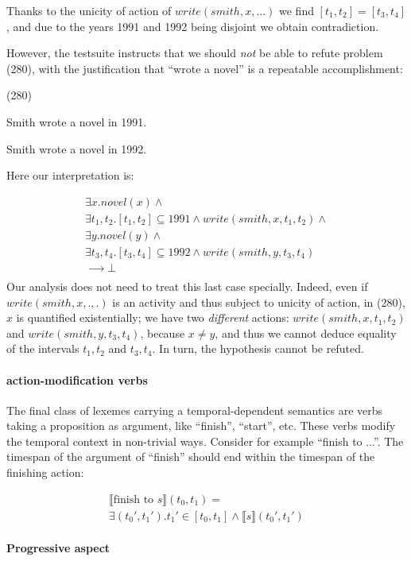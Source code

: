 \documentclass[a4paper,11pt]{article}
\newcommand\hyp{\item[H]}
\newcommand\fracasex[2]{\begin{lingex}\item[(#1)] \begin{subex} #2 \end{subex} \end{lingex} }
\begin{document}
Thanks to the unicity of action of $write(smith,x,...)$ we find
\([t_1,t_2] = [t_3,t_4]\), and due to the years 1991 and 1992 being
disjoint we obtain contradiction.

However, the testsuite instructs that we should \emph{not} be able to refute
problem (280), with the justification that ``wrote a novel'' is a repeatable
accomplishment:

\fracasex{280}{
\item	Smith wrote a novel in 1991.
\hyp 	Smith wrote a novel in 1992.
}
Here our interpretation is:

\[\begin{array}{l}
∃x. novel(x) ∧ \\
∃t_1,t_2. [t_1,t_2] ⊆ 1991 ∧ write(smith,x,t_1,t_2) ∧ \\
∃y. novel(y) ∧ \\
∃t_3,t_4. [t_3,t_4] ⊆ 1992 ∧ write(smith,y,t_3,t_4) \\
⟶ ⊥ \\
\end{array}
\]
Our analysis does not need to treat this last case specially. Indeed,
even if $write(smith,x,.,.)$ is an activity  and thus subject to
unicity of action, in (280), $x$ is quantified existentially; we have
two \emph{different} actions: $write(smith,x,t_1,t_2)$ and
$write(smith,y,t_3,t_4)$, because $x \neq y$, and thus we cannot deduce equality of the
intervals $t_1,t_2$ and $t_3,t_4$. In turn, the hypothesis cannot be refuted.

\paragraph{action-modification verbs}

The final class of lexemes carrying a temporal-dependent semantics are
verbs taking a proposition as argument, like ``finish'', ``start'',
etc. These verbs modify the temporal context in non-trivial
ways. Consider for example ``finish to ...''. The timespan of the
argument of ``finish'' should end within the timespan of the finishing
action:

\begin{multline*}
⟦\text{finish to \(s\)}⟧(t_0,t_1) = \\ ∃(t_0',t_1'). t_1' ∈ [t_0,t_1] ∧ ⟦s⟧(t_0',t_1')
\end{multline*}

\paragraph{Progressive aspect}
\end{document}
